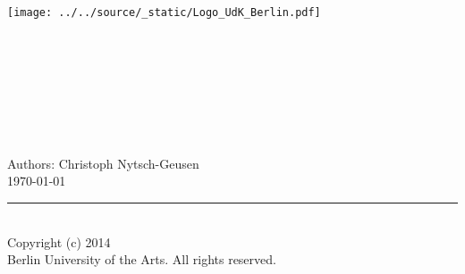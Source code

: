 \begin{titlepage}
\begin{minipage}{\headwidth}
\hspace*{9.0cm}\texttt{[image: ../../source/\_static/Logo\_UdK\_Berlin.pdf]}
\begin{flushright}
\vspace{-1cm}
\large{~}
\\[5mm]
\hrulefill
\\[5mm]
 \Huge{}\\
 \Large\sffamily{~}\\[3mm]
 \Large\sffamily{~}\\
 \Huge{}
\\
\hrulefill
~\\[40mm]
\large{Authors: Christoph Nytsch-Geusen}\\[30mm]
\large{\today}
\\[30mm]
\end{flushright}
\hrule
~\\[2mm]
\small{Copyright (c) 2014}\\
\small{Berlin University of the Arts.}
\small{All rights reserved.}
\end{minipage}
\end{titlepage}
